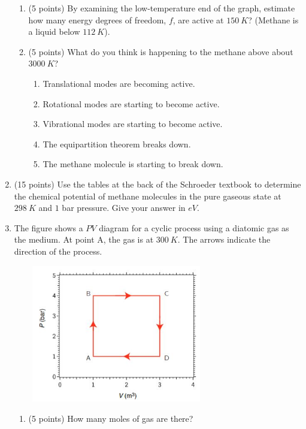 \documentclass[fleqn]{article}
\begin{document}
\begin{enumerate}
\begin{enumerate}
      \item (5 points) By examining the low-temperature end of the graph, estimate how many energy
      degrees of freedom, $f$, are active at $150 ~ K$? (Methane is a liquid below $112 ~ K$).


      \item (5 points) What do you think is happening to the methane above about $3000 ~ K$?
      \begin{enumerate}
        \item Translational modes are becoming active.

        \item Rotational modes are starting to become active.

        \item Vibrational modes are starting to become active.

        \item The equipartition theorem breaks down.

        \item The methane molecule is starting to break down.

      \end{enumerate}

    \end{enumerate}


    \item (15 points) Use the tables at the back of the Schroeder textbook to determine the chemical
    potential of methane molecules in the pure gaseous state at $298 ~ K$ and $1$ bar pressure. Give
    your answer in $eV$.



    \item The figure shows a $PV$ diagram for a cyclic process using a diatomic gas as the medium. At
    point A, the gas is at $300 ~ K$. The arrows indicate the direction of the process.
    \begin{center}
      \includegraphics[height=6cm, width=9cm]{question6.JPG}
    \end{center}
    \begin{enumerate}
      \item (5 points) How many moles of gas are there?


\end{enumerate}
\end{enumerate}
\end{document}

